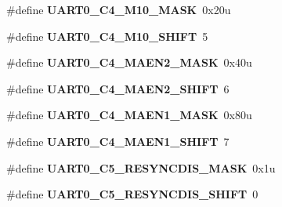 \begin{DoxyCompactItemize}
\item 
\hypertarget{group___u_a_r_t0___register___masks_ga778c67fb72d292b38f63c9381650b13f}{}\#define {\bfseries U\+A\+R\+T0\+\_\+\+C4\+\_\+\+M10\+\_\+\+M\+A\+S\+K}~0x20u\label{group___u_a_r_t0___register___masks_ga778c67fb72d292b38f63c9381650b13f}

\item 
\hypertarget{group___u_a_r_t0___register___masks_gab29f680fddde40016111f2aef73cc7b2}{}\#define {\bfseries U\+A\+R\+T0\+\_\+\+C4\+\_\+\+M10\+\_\+\+S\+H\+I\+F\+T}~5\label{group___u_a_r_t0___register___masks_gab29f680fddde40016111f2aef73cc7b2}

\item 
\hypertarget{group___u_a_r_t0___register___masks_ga969c6c22e07f6502ff99cbf303b87d23}{}\#define {\bfseries U\+A\+R\+T0\+\_\+\+C4\+\_\+\+M\+A\+E\+N2\+\_\+\+M\+A\+S\+K}~0x40u\label{group___u_a_r_t0___register___masks_ga969c6c22e07f6502ff99cbf303b87d23}

\item 
\hypertarget{group___u_a_r_t0___register___masks_gaeebc760f3af31b66126f430423fc0131}{}\#define {\bfseries U\+A\+R\+T0\+\_\+\+C4\+\_\+\+M\+A\+E\+N2\+\_\+\+S\+H\+I\+F\+T}~6\label{group___u_a_r_t0___register___masks_gaeebc760f3af31b66126f430423fc0131}

\item 
\hypertarget{group___u_a_r_t0___register___masks_ga68a92c3e845ce6ef575114d47d5d447c}{}\#define {\bfseries U\+A\+R\+T0\+\_\+\+C4\+\_\+\+M\+A\+E\+N1\+\_\+\+M\+A\+S\+K}~0x80u\label{group___u_a_r_t0___register___masks_ga68a92c3e845ce6ef575114d47d5d447c}

\item 
\hypertarget{group___u_a_r_t0___register___masks_ga799c5f7dd350d4bd89d04167fa771396}{}\#define {\bfseries U\+A\+R\+T0\+\_\+\+C4\+\_\+\+M\+A\+E\+N1\+\_\+\+S\+H\+I\+F\+T}~7\label{group___u_a_r_t0___register___masks_ga799c5f7dd350d4bd89d04167fa771396}

\item 
\hypertarget{group___u_a_r_t0___register___masks_ga6cbc7334e715b4d22547ae185dc63dda}{}\#define {\bfseries U\+A\+R\+T0\+\_\+\+C5\+\_\+\+R\+E\+S\+Y\+N\+C\+D\+I\+S\+\_\+\+M\+A\+S\+K}~0x1u\label{group___u_a_r_t0___register___masks_ga6cbc7334e715b4d22547ae185dc63dda}

\item 
\hypertarget{group___u_a_r_t0___register___masks_gaf769ed12082fb9c441d47f5cdf1117e0}{}\#define {\bfseries U\+A\+R\+T0\+\_\+\+C5\+\_\+\+R\+E\+S\+Y\+N\+C\+D\+I\+S\+\_\+\+S\+H\+I\+F\+T}~0\label{group___u_a_r_t0___register___masks_gaf769ed12082fb9c441d47f5cdf1117e0}


\end{DoxyCompactItemize}
